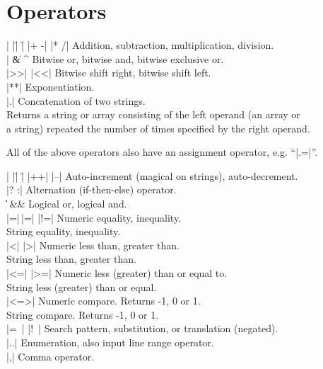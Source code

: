 \section{Operators} 

\begin{tabbing}
|    |\=|    |\= \kill
|+ -| \> |* /| \> Addition, subtraction, multiplication, division. \\
|%
\| \& \> \^ \> Bitwise or, bitwise and, bitwise exclusive or. \\
|>>| \> |<<| \> Bitwise shift right, bitwise shift left. \\
|**| \> \> Exponentiation. \\
|.| \> \> Concatenation of two strings. \\
 \> \> Returns a string or array consisting of the left operand
(an array or \\
\> \> a string) repeated the number of times specified by the right operand.
\end{tabbing}

All of the above operators also have an assignment operator, e.g. ``|.=|''.

\begin{tabbing}
|    |\=|    |\= \kill
|++| \> |--| \> Auto-increment (magical on strings), auto-decrement. \\
|? :|\>      \> Alternation (if-then-else) operator. \\
\|\| \> \&\&   \> Logical or, logical and. \\
|=|\,|=| \> |!=| \> Numeric equality, inequality. \\
 \>  \> String equality, inequality. \\
|<|  \>  |>|  \> Numeric less than, greater than. \\
 \>  \> String less than, greater than. \\
|<=| \> |>=| \> Numeric less (greater) than or equal to. \\
 \>  \> String less (greater) than or equal. \\
|<=>| \> \> Numeric compare. Returns -1, 0 or 1. \\
 \> \> String compare. Returns -1, 0 or 1. \\
|=~| \> |!~| \> Search pattern, substitution, or translation (negated). \\
|..| \> \> Enumeration, also input line range operator. \\
|,| \> \> Comma operator.
\end{tabbing}
